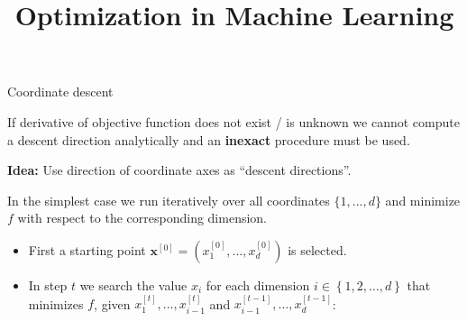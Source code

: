 \documentclass[11pt,compress,t,notes=noshow, xcolor=table]{beamer}
\title{Optimization in Machine Learning}
\date{}
\begin{document}
\sloppy


\begin{vbframe}{Coordinate descent}

If derivative of objective function does not exist / is unknown we cannot compute a descent direction analytically and an \textbf{inexact} procedure must be used.

\lz 

\textbf{Idea:} Use direction of coordinate axes as \enquote{descent directions}.


\lz

In the simplest case we run iteratively over all coordinates $\{1, ...,d\}$ and minimize $f$ with respect to the corresponding dimension.


\framebreak

\begin{itemize}
\item First a starting point $\bm{x}^{[0]} = \left(x^{[0]}_1, \hdots, x^{[0]}_d\right)$ is selected.
\item In step $t$ we search the value $x_i$ for each dimension $i \in \left\{1,2,\hdots,d\right\}$
that minimizes $f$, given $x^{[t]}_1, \hdots,x^{[t]}_{i-1}$ and $x^{[t-1]}_{i-1}, \hdots,x^{[t-1]}_d$:
\end{itemize}


\end{vbframe}
\end{document}
